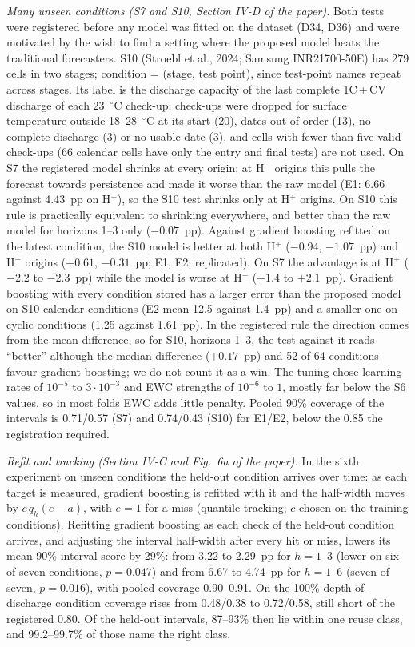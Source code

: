 \documentclass[conference]{IEEEtran}
\begin{document}
\emph{Many unseen conditions (S7 and S10, Section IV-D of the paper).} Both tests were registered before any model was fitted on the dataset (D34, D36) and were motivated by the wish to find a setting where the proposed model beats the traditional forecasters. S10 (Stroebl et al., 2024; Samsung INR21700-50E) has 279 cells in two stages; condition = (stage, test point), since test-point names repeat across stages. Its label is the discharge capacity of the last complete 1C\,+\,CV discharge of each 23~$^\circ$C check-up; check-ups were dropped for surface temperature outside 18--28~$^\circ$C at its start (20), dates out of order (13), no complete discharge (3) or no usable date (3), and cells with fewer than five valid check-ups (66 calendar cells have only the entry and final tests) are not used. On S7 the registered model shrinks at every origin; at H$^-$ origins this pulls the forecast towards persistence and made it worse than the raw model (E1: 6.66 against 4.43~pp on H$^-$), so the S10 test shrinks only at H$^+$ origins. On S10 this rule is practically equivalent to shrinking everywhere, and better than the raw model for horizons 1--3 only ($-0.07$~pp). Against gradient boosting refitted on the latest condition, the S10 model is better at both H$^+$ ($-0.94$, $-1.07$~pp) and H$^-$ origins ($-0.61$, $-0.31$~pp; E1, E2; replicated). On S7 the advantage is at H$^+$ ($-2.2$ to $-2.3$~pp) while the model is worse at H$^-$ ($+1.4$ to $+2.1$~pp). Gradient boosting with every condition stored has a larger error than the proposed model on S10 calendar conditions (E2 mean 12.5 against 1.4~pp) and a smaller one on cyclic conditions (1.25 against 1.61~pp). In the registered rule the direction comes from the mean difference, so for S10, horizons 1--3, the test against it reads ``better'' although the median difference ($+0.17$~pp) and 52 of 64 conditions favour gradient boosting; we do not count it as a win. The tuning chose learning rates of $10^{-5}$ to $3\cdot10^{-3}$ and EWC strengths of $10^{-6}$ to $1$, mostly far below the S6 values, so in most folds EWC adds little penalty. Pooled 90\% coverage of the intervals is 0.71/0.57 (S7) and 0.74/0.43 (S10) for E1/E2, below the 0.85 the registration required.

\emph{Refit and tracking (Section IV-C and Fig.~6a of the paper).} In the sixth experiment on unseen conditions the held-out condition arrives over time: as each target is measured, gradient boosting is refitted with it and the half-width moves by $c\,q_h(e-a)$, with $e=1$ for a miss (quantile tracking; $c$ chosen on the training conditions). Refitting gradient boosting as each check of the held-out condition arrives, and adjusting the interval half-width after every hit or miss, lowers its mean 90\% interval score by 29\%: from 3.22 to 2.29~pp for $h{=}1$--3 (lower on six of seven conditions, $p=0.047$) and from 6.67 to 4.74~pp for $h{=}1$--6 (seven of seven, $p=0.016$), with pooled coverage 0.90--0.91. On the 100\% depth-of-discharge condition coverage rises from 0.48/0.38 to 0.72/0.58, still short of the registered 0.80. Of the held-out intervals, 87--93\% then lie within one reuse class, and 99.2--99.7\% of those name the right class.
\end{document}
